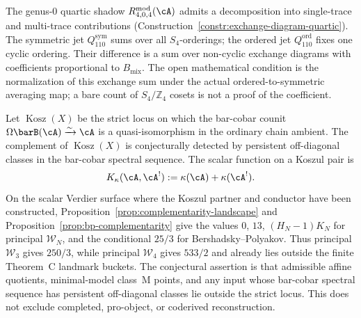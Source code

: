 \begin{remark}
The genus-$0$ quartic shadow
$R^{\mathrm{mod}}_{4,0,4}(\cA)$ admits a decomposition
into single-trace and multi-trace contributions
(Construction~\ref{constr:exchange-diagram-quartic}).
The symmetric jet $Q^{\mathrm{sym}}_{110}$ sums over all
$S_4$-orderings; the ordered jet $Q^{\mathrm{ord}}_{110}$
fixes one cyclic ordering. Their difference is a sum over
non-cyclic exchange diagrams with coefficients proportional to
$B_{\mathrm{mix}}$. The open mathematical condition is the normalization of this
exchange sum under the actual ordered-to-symmetric averaging map; a
bare count of $S_4/\mathbb Z_4$ cosets is not a proof of the
coefficient.
\end{remark}

\begin{conjecture}
\label{conj:koszul-swampland}
\ClaimStatusConjectured
{}
Let $\operatorname{Kosz}(X)$ be the strict locus on which the
bar-cobar counit
$\Omega\barB(\cA)\xrightarrow{\sim}\cA$ is a quasi-isomorphism in
the ordinary chain ambient. The complement of
$\operatorname{Kosz}(X)$ is conjecturally detected by persistent
off-diagonal classes in the bar-cobar spectral sequence. The scalar
function on a Koszul pair is
\[
K_\kappa(\cA,\cA^!) := \kappa(\cA) + \kappa(\cA^!).
\]
On the scalar Verdier surface where the Koszul partner and conductor
have been constructed, Proposition~\ref{prop:complementarity-landscape}
and Proposition~\ref{prop:bp-complementarity} give the values
$0$, $13$, $(H_N-1)K_N$ for principal $\mathcal W_N$, and the
conditional $25/3$
for Bershadsky--Polyakov. Thus principal $\mathcal W_3$ gives
$250/3$, while principal $\mathcal W_4$ gives $533/2$ and already
lies outside the finite Theorem~C landmark buckets. The conjectural
assertion is that admissible affine quotients, minimal-model
class~M points, and any input whose bar-cobar spectral sequence has
persistent off-diagonal classes lie outside the strict locus. This
does not exclude completed, pro-object, or coderived reconstruction.
\end{conjecture}


